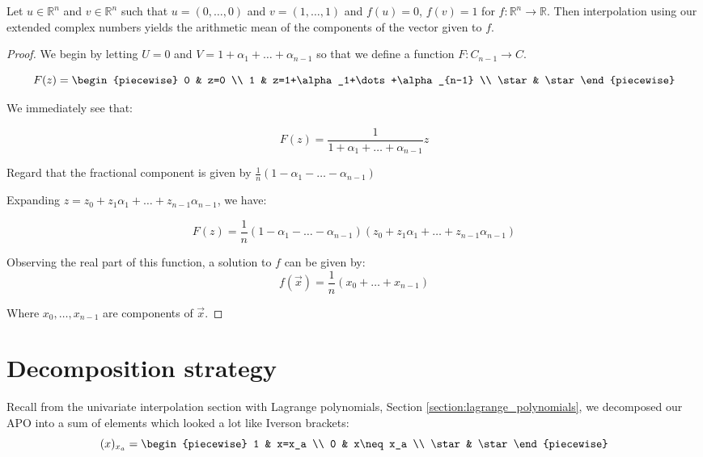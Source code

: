 \begin{example}
    Let $u\in\mathbb{R}^n$ and $v\in\mathbb{R}^n$ such that $u=(0,\dots,0)$ and $v=(1,\dots,1)$ and $f(u)=0$, $f(v)=1$ for $f:\mathbb{R}^n\to\mathbb{R}$. Then interpolation using our extended complex numbers yields the arithmetic mean of the components of the vector given to $f$.

    \begin{proof}
        We begin by letting $U=0$ and $V=1+\alpha_1+\dots+\alpha_{n-1}$ so that we define a function $F:C_{n-1}\to C$.

        $$
            F(z) = \begin{piecewise}
                0 & z=0 \\
                1 & z=1+\alpha_1+\dots+\alpha_{n-1} \\
                \star & \star
            \end{piecewise}
        $$

        We immediately see that:

        $$
            F(z)=\frac{1}{1+\alpha_1+\dots+\alpha_{n-1}}z
        $$

        Regard that the fractional component is given by $\frac{1}{n}(1-\alpha_1-\dots-\alpha_{n-1})$

        Expanding $z=z_0+z_1\alpha_1+\dots+z_{n-1}\alpha_{n-1}$, we have:

        $$
            F(z)=\frac{1}{n}(1-\alpha_1-\dots-\alpha_{n-1})(z_0+z_1\alpha_1+\dots+z_{n-1}\alpha_{n-1})
        $$

        Observing the real part of this function, a solution to $f$ can be given by:
        $$
            f(\vec{x})=\frac{1}{n}(x_0+\dots+x_{n-1})
        $$

        Where $x_0,\dots,x_{n-1}$ are components of $\vec{x}$.
    \end{proof}
\end{example}

\section{Decomposition strategy}
Recall from the univariate interpolation section with Lagrange polynomials, Section \ref{section:lagrange_polynomials}, we decomposed our APO into a sum of elements which looked a lot like Iverson brackets:
$$
    (x)_{x_a}=\begin{piecewise}
        1 & x=x_a \\
        0 & x\neq x_a \\
        \star & \star
    \end{piecewise}
$$

